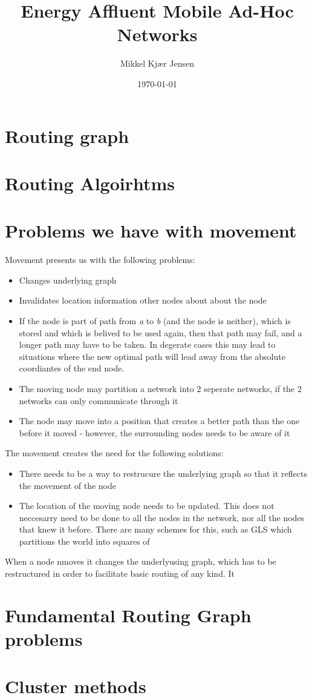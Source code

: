 \documentclass[letter, 12pt, english, draft]{article}
\title{Energy Affluent Mobile Ad-Hoc Networks}
\author{Mikkel Kjær Jensen}
\date{\today}
\begin{document}
\pagestyle{fancy}

\section{Routing graph}


\section{Routing Algoirhtms}


\section{Problems we have with movement}

Movement presents us with the following problems:

\begin{itemize}
\item Changes underlying graph
\item Invalidates location information other nodes about about the node
\item If the node is part of path from \emph{a} to \emph{b} (and the node is neither), which is stored and which is belived to be used again, then that path may fail, and a longer path may have to be taken. In degerate cases this may lead to situations where the new optimal path will lead away from the absolute coordiantes of the end node.
\item The moving node may partition a network into 2 seperate networks, if the 2 networks can only communicate through it
\item The node may move into a position that creates a better path than the one before it moved - however, the surrounding nodes needs to be aware of it
\end{itemize}

The movement creates the need for the following solutions:
\begin{itemize}
\item There needs to be a way to restrucure the underlying graph so that it reflects the movement of the node \cite{practical}
\item The location of the moving node needs to be updated. This does not neccesarry need to be done to all the nodes in the network, nor all the nodes that knew it before. There are many schemes for this, such as GLS \cite{scaleLocation} which partitions the world into squares of  
\end{itemize}


When a node nmoves it changes the underlyusing graph, which has to be restructured in order to facilitate basic routing of any kind. It 

\section{Fundamental Routing Graph problems}


\section{Cluster methods}


{}
\end{document}
